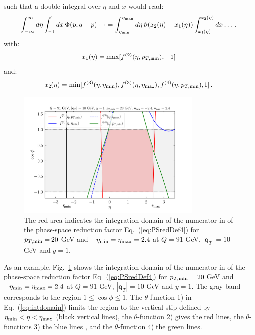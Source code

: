 \documentclass[10pt,a4paper]{article}
\begin{document}
such that a double integral over $\eta$ and $x$ would read:
\begin{equation}
\int_{-\infty}^{\infty}d\eta\int_{-1}^{1}dx\,\Phi(p,q-p)\dots =
\int_{\eta_{\rm min}}^{\eta_{\rm
    max}}d\eta\,\vartheta(x_2(\eta)-x_1(\eta))\int_{x_1(\eta)}^{x_2(\eta)}dx\dots\,.
\end{equation}
with:
\begin{equation}
x_1(\eta) = \mbox{max}[f^{(2)}(\eta,p_{T,\rm min}),-1]
\end{equation}
and:
\begin{equation}
x_2(\eta) = \mbox{min}[f^{(3)}(\eta,\eta_{\rm min}),f^{(3)}(\eta,\eta_{\rm
         max}),f^{(4)}(\eta,p_{T,\rm
         min}),1]\,.
\end{equation}

\begin{figure}[t]
  \begin{centering}
    \includegraphics[width=0.8\textwidth]{plots/IntDomain}
    \caption{The red area indicates the integration domain of the
      numerator in of the phase-space reduction factor
      Eq.~(\ref{eq:PSredDef4}) for $p_{T,\rm min}=20$ GeV and
      $-\eta_{\rm min}=\eta_{\rm max}=2.4$ at $Q=91$ GeV, $|\mathbf{q}_T|=10$ GeV and
      $y=1$.\label{fig:IntDomain}}
  \end{centering}
\end{figure}
As an example, Fig.~\ref{fig:IntDomain} shows the integration domain
of the numerator in of the phase-space reduction factor
Eq.~(\ref{eq:PSredDef4}) for $p_{T,\rm min}=20$ GeV and
$-\eta_{\rm min}=\eta_{\rm max}=2.4$ at $Q=91$ GeV,
$|\mathbf{q}_T|=10$ GeV and $y=1$.  The gray band corresponds to the
region $1\leq\cos\phi\leq 1$. The $\theta$-function 1) in
Eq.~(\ref{eq:intdomain}) limits the region to the vertical stip
defined by $\eta_{\rm min} < \eta < \eta_{\rm max}$ (black vertical
lines), the $\theta$-function 2) gives the red lines, the
$\theta$-functions 3) the blue lines , and the $\theta$-function 4)
the green lines.
\end{document}
